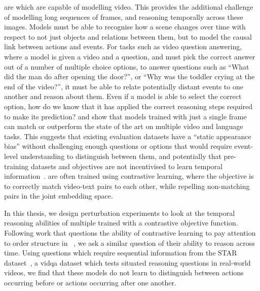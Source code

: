  are  which are capable of modelling video.
This provides the additional challenge of modelling long sequences of frames,
and reasoning temporally across these images. Models must be able to recognise
how a scene changes over time with respect to not just objects and relations
between them, but to model the causal link between actions and events. For
tasks such as video question answering, where a model is given a video and a
question, and must pick the correct answer out of a number of multiple choice
options, to answer questions such as ``What did the man do after opening the
door?'', or ``Why was the toddler crying at the end of the video?'', it must be
able to relate potentially distant events to one another and reason about them.
Even if a model is able to select the correct option, how do we know that it
has applied the correct reasoning steps required to make its prediction?
\citet{lei2023revealing} and \citet{buch2022revisiting} show that models
trained with just a single frame can match or outperform the state of the art
on multiple video and language tasks. This suggests that existing evaluation
datasets have a ``static appearance bias'' without challenging enough questions
or options that would require event-level understanding to distinguish between
them, and potentially that pre-training datasets and objectives are not
incentivised to learn temporal information~\cite{momeni2023verbs}.
 are often trained using contrastive learning, where the
objective is to correctly match video-text pairs to each other, while repelling
non-matching pairs in the joint embedding space.

In this thesis, we design perturbation experiments to look at the temporal
reasoning abilities of multiple  trained with a contrastive
objective function. Following work that questions the ability of contrastive
learning to pay attention to order structure in
~\citep{yuksekgonul2023when}, we ask a similar question of
their ability to reason across time. Using questions which require sequential
information from the STAR dataset~\cite{wu2021star}, a \acrfull{vidqa} dataset
which tests situated reasoning questions in real-world videos, we find that
these models do not learn to distinguish between actions occurring before or
actions occurring after one another.


